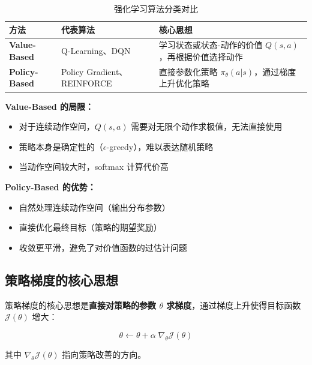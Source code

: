 \documentclass[12pt,a4paper]{article}
\newcommand{\grad}{\nabla}
\theoremstyle{noteplain}
\theoremstyle{noteexercise}
\begin{document}
\begin{table}[H]
  \centering
  \caption{强化学习算法分类对比}
  \label{tab:rl-comparison}
  \begin{tabular}{>{\centering\arraybackslash}m{3cm}
                 >{\centering\arraybackslash}m{4cm}
                 >{\centering\arraybackslash}m{6cm}}
    \toprule
    \textbf{方法} & \textbf{代表算法} & \textbf{核心思想} \\
    \midrule
    \textbf{Value-Based} & Q-Learning、DQN & 学习状态或状态-动作的价值 $Q(s,a)$，再根据价值选择动作 \\
    \midrule
    \textbf{Policy-Based} & Policy Gradient、REINFORCE & 直接参数化策略 $\pi_\theta(a|s)$，通过梯度上升优化策略 \\
    \bottomrule
  \end{tabular}
\end{table}

\textbf{Value-Based 的局限：}
\begin{itemize}
  \setlength{\itemsep}{0.3em}
  \item 对于连续动作空间，$Q(s,a)$ 需要对无限个动作求极值，无法直接使用
  \item 策略本身是确定性的（$\epsilon$-greedy），难以表达随机策略
  \item 当动作空间较大时，softmax 计算代价高
\end{itemize}

\textbf{Policy-Based 的优势：}
\begin{itemize}
  \setlength{\itemsep}{0.3em}
  \item 自然处理连续动作空间（输出分布参数）
  \item 直接优化最终目标（策略的期望奖励）
  \item 收敛更平滑，避免了对价值函数的过估计问题
\end{itemize}

\subsection{策略梯度的核心思想}\label{ssec:core-idea}

策略梯度的核心思想是\textbf{直接对策略的参数 $\theta$ 求梯度}，通过梯度上升使得目标函数 $\mathcal{J}(\theta)$ 增大：

\begin{equation}\label{eq:pg-update}
  \theta \leftarrow \theta + \alpha \; \grad_\theta \mathcal{J}(\theta)
\end{equation}

其中 $\grad_\theta \mathcal{J}(\theta)$ 指向策略改善的方向。
\end{document}
